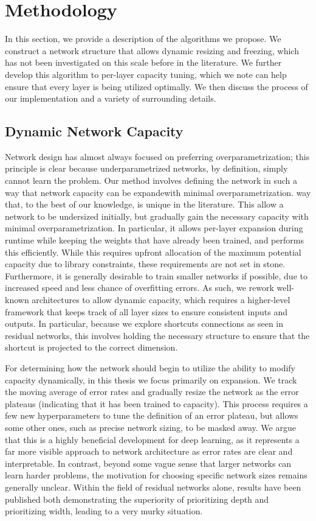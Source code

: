 \chapter{Methodology}
In this section, we provide a description of the algorithms we propose.
We construct a network structure that allows dynamic resizing and freezing, which has not been investigated on this scale before in the literature.
We further develop this algorithm to per-layer capacity tuning, which we note can help ensure that every layer is being utilized optimally.
We then discuss the process of our implementation and a variety of surrounding details.

\section{Dynamic Network Capacity}
Network design has almost always focused on preferring overparametrization; this principle is clear because underparametrized networks, by definition, simply cannot learn the problem.
Our method involves defining the network in such a way that network capacity can be expandewith minimal overparametrization. way that, to the best of our knowledge, is unique in the literature.
This allow a network to be undersized initially, but gradually gain the necessary capacity with minimal overparametrization.
In particular, it allows per-layer expansion during runtime while keeping the weights that have already been trained, and performs this efficiently.
While this requires upfront allocation of the maximum potential capacity due to library constraints, these requirements are not set in stone.
Furthermore, it is generally desirable to train smaller networks if possible, due to increased speed and less chance of overfitting errors.
As such, we rework well-known architectures to allow dynamic capacity, which requires a higher-level framework that keeps track of all layer sizes to ensure consistent inputs and outputs.
In particular, because we explore shortcuts connections as seen in residual networks, this involves holding the necessary structure to ensure that the shortcut is projected to the correct dimension.

For determining how the network should begin to utilize the ability to modify capacity dynamically, in this thesis we focus primarily on expansion.
We track the moving average of error rates and gradually resize the network as the error plateaus (indicating that it has been trained to capacity).
This process requires a few new hyperparameters to tune the definition of an error plateau, but allows some other ones, such as  precise network sizing, to be masked away.
We argue that this is a highly beneficial development for deep learning, as it represents a far more visible approach to network architecture as error rates are clear and interpretable.
In contrast, beyond some vague sense that larger networks can learn harder problems, the motivation for choosing specific network sizes remains generally unclear.
Within the field of residual networks alone, results have been published both demonstrating the superiority of prioritizing depth and prioritizing width, leading to a very murky situation.


